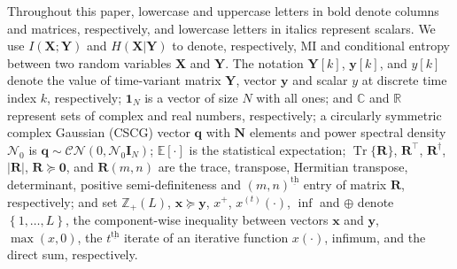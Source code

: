 \documentclass[9pt,journal]{IEEEtran}
\DeclareMathOperator{\trace}{Tr}
\newcommand{\paren}[1]{\left({#1}\right)}
\newcommand{\bracket}[1]{{\left [{#1}\right ]}}
\newcommand{\ith}[1]    {{#1}^{\underline{\text{th}}}}
\theoremstyle{definition}
\begin{document}
Throughout this paper, lowercase and uppercase letters in bold denote columns and matrices, respectively, and lowercase letters in italics represent scalars. We use $I(\mathbf{X};\mathbf{Y})$ and $H\paren{\mathbf{X}|\mathbf{Y}}$ to denote, respectively, MI and conditional entropy between two random variables $\mathbf{X}$ and $\mathbf{Y}$. The notation $\mathbf{Y}\bracket{k}$, $\mathbf{y}\bracket{k}$, and $y\bracket{k}$ denote the value of time-variant matrix $\mathbf{Y}$, vector $\mathbf{y}$ and scalar $y$ at discrete time index $k$, respectively; $\mathbf{1}_{\mathit{N}}$ is a vector of size $\mathit{N}$ with all ones; and $\mathbb{C}$ and $\mathbb{R}$ represent sets of complex and real numbers, respectively; a circularly symmetric complex Gaussian (CSCG) vector $\mathbf{q}$ with $\mathbf{N}$ elements and power spectral density $\mathcal{N}_0$ is $\mathbf{q}\sim\mathcal{CN}(0,\mathcal{N}_0\mathbf{I}_{\mathit{N}})$; $\mathbb{E}\bracket{\cdot}$ is the statistical expectation; $\trace\{\mathbf{R}\}$, $\mathbf{R}^\top$, $\mathbf{R}^\dagger$, $\left| \mathbf{R}\right|$, $\mathbf{R}\succeq\mathbf{0}$, and $\mathbf{R}\paren{m,n}$ are the trace, transpose, Hermitian transpose, determinant, positive semi-definiteness and $\ith{\paren{m,n}}$ entry of matrix $\mathbf{R}$, respectively; and set $\mathbb{Z}_{+}(L)$, $\mathbf{x}\succeq\mathbf{y}$, $x^+$, $x^{\paren{t}}\paren{\cdot}$, $\inf$ and $\oplus$ denote $\left\lbrace1,\dots,L\right\rbrace$, the component-wise inequality between vectors $\mathbf{x}$ and $\mathbf{y}$, $\max(x,0)$, the $\ith{t}$ iterate of an iterative function $x\paren{\cdot}$, infimum, and the direct sum, respectively.
\end{document}
